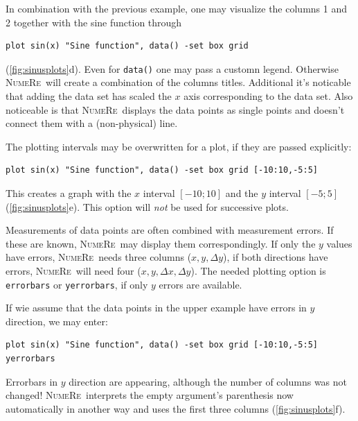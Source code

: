 \documentclass[DIV=14,headsepline,footsepline]{scrbook}
\newcommand{\NR}{\textsc{Nu\-me\-Re}}
\begin{document}
				In combination with the previous example, one may visualize the columns 1 and 2 together with the sine function through
				\begin{lstlisting}
plot sin(x) "Sine function", data() -set box grid
				\end{lstlisting}
				(\autoref{fig:sinusplots}d). Even for \lstinline+data()+ one may pass a customn legend. Otherwise \NR\ will create a combination of the columns titles. Additional it's noticable that adding the data set has scaled the $x$ axis corresponding to the data set. Also noticeable is that \NR\ displays the data points as single points and doesn't connect them with a (non-physical) line.
				
				The plotting intervals may be overwritten for a plot, if they are passed explicitly:
				\begin{lstlisting}
plot sin(x) "Sine function", data() -set box grid [-10:10,-5:5]
				\end{lstlisting}
				This creates a graph with the $x$ interval $[-10;10]$ and the $y$ interval $[-5;5]$ (\autoref{fig:sinusplots}e). This option will \emph{not} be used for successive plots.
				
				Measurements of data points are often combined with measurement errors. If these are known, \NR\ may display them correspondingly. If only the $y$ values have errors, \NR\ needs three columns ($x,y,\Delta y$), if both directions have errors, \NR\ will need four ($x,y,\Delta x, \Delta y$). The needed plotting option is \lstinline+errorbars+ or \lstinline+yerrorbars+, if only $y$ errors are available.
				
				If wie assume that the data points in the upper example have errors in $y$ direction, we may enter:
				\begin{lstlisting}
plot sin(x) "Sine function", data() -set box grid [-10:10,-5:5] yerrorbars
				\end{lstlisting}
				Errorbars in $y$ direction are appearing, although the number of columns was not changed! \NR\ interprets the empty argument's parenthesis now automatically in another way and uses the first three columns (\autoref{fig:sinusplots}f).
				
\end{document}
